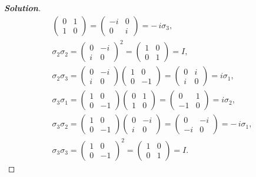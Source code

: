 \documentclass[a4paper,11pt]{article}
\newenvironment{solution}[1]
  {\renewcommand\qedsymbol{$\square$}\begin{proof}[\textbf{Solution#1}]}
  {\end{proof}}
\begin{document}
\begin{solution}{}
\begin{gather}
        \begin{pmatrix} 0 & 1 \\ 1 & 0 \end{pmatrix} 
        = \begin{pmatrix} -i & 0 \\ 0 & i \end{pmatrix} = -\,i\sigma_3, \\
        \sigma_2\sigma_2 = \begin{pmatrix} 0 & -i \\ i & 0 \end{pmatrix}^2 
        = \begin{pmatrix} 1 & 0 \\ 0 & 1 \end{pmatrix} = I, \\
        \sigma_2\sigma_3 = \begin{pmatrix} 0 & -i \\ i & 0 \end{pmatrix}
        \begin{pmatrix} 1 & 0 \\ 0 & -1 \end{pmatrix} 
        = \begin{pmatrix} 0 & i \\ i & 0 \end{pmatrix} = i\sigma_1, \\
        \sigma_3\sigma_1 = \begin{pmatrix} 1 & 0 \\ 0 & -1 \end{pmatrix}
        \begin{pmatrix} 0 & 1 \\ 1 & 0 \end{pmatrix} 
        = \begin{pmatrix} 0 & 1 \\ -1 & 0 \end{pmatrix} = i\sigma_2, \\
        \sigma_3\sigma_2 = \begin{pmatrix} 1 & 0 \\ 0 & -1 \end{pmatrix}
        \begin{pmatrix} 0 & -i \\ i & 0 \end{pmatrix} 
        = \begin{pmatrix} 0 & -i \\ -i & 0 \end{pmatrix} = -\,i\sigma_1, \\
        \sigma_3\sigma_3 = \begin{pmatrix} 1 & 0 \\ 0 & -1 \end{pmatrix}^2 
        = \begin{pmatrix} 1 & 0 \\ 0 & 1 \end{pmatrix} = I.
    \end{gather}
    

\end{solution}
\end{document}
